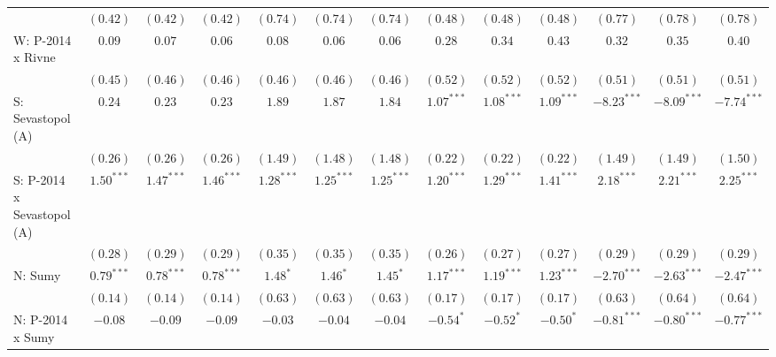 \begin{table}
\begin{center}
\begin{tiny}
\begin{tabular}{l c c c c c c c c c c c c}
                            & $(0.42)$      & $(0.42)$      & $(0.42)$      & $(0.74)$     & $(0.74)$     & $(0.74)$     & $(0.48)$      & $(0.48)$     & $(0.48)$       & $(0.77)$      & $(0.78)$      & $(0.78)$      \\
W: P-2014 x Rivne           & $0.09$        & $0.07$        & $0.06$        & $0.08$       & $0.06$       & $0.06$       & $0.28$        & $0.34$       & $0.43$         & $0.32$        & $0.35$        & $0.40$        \\
                            & $(0.45)$      & $(0.46)$      & $(0.46)$      & $(0.46)$     & $(0.46)$     & $(0.46)$     & $(0.52)$      & $(0.52)$     & $(0.52)$       & $(0.51)$      & $(0.51)$      & $(0.51)$      \\
S: Sevastopol (A)           & $0.24$        & $0.23$        & $0.23$        & $1.89$       & $1.87$       & $1.84$       & $1.07^{***}$  & $1.08^{***}$ & $1.09^{***}$   & $-8.23^{***}$ & $-8.09^{***}$ & $-7.74^{***}$ \\
                            & $(0.26)$      & $(0.26)$      & $(0.26)$      & $(1.49)$     & $(1.48)$     & $(1.48)$     & $(0.22)$      & $(0.22)$     & $(0.22)$       & $(1.49)$      & $(1.49)$      & $(1.50)$      \\
S: P-2014 x Sevastopol (A)  & $1.50^{***}$  & $1.47^{***}$  & $1.46^{***}$  & $1.28^{***}$ & $1.25^{***}$ & $1.25^{***}$ & $1.20^{***}$  & $1.29^{***}$ & $1.41^{***}$   & $2.18^{***}$  & $2.21^{***}$  & $2.25^{***}$  \\
                            & $(0.28)$      & $(0.29)$      & $(0.29)$      & $(0.35)$     & $(0.35)$     & $(0.35)$     & $(0.26)$      & $(0.27)$     & $(0.27)$       & $(0.29)$      & $(0.29)$      & $(0.29)$      \\
N: Sumy                     & $0.79^{***}$  & $0.78^{***}$  & $0.78^{***}$  & $1.48^{*}$   & $1.46^{*}$   & $1.45^{*}$   & $1.17^{***}$  & $1.19^{***}$ & $1.23^{***}$   & $-2.70^{***}$ & $-2.63^{***}$ & $-2.47^{***}$ \\
                            & $(0.14)$      & $(0.14)$      & $(0.14)$      & $(0.63)$     & $(0.63)$     & $(0.63)$     & $(0.17)$      & $(0.17)$     & $(0.17)$       & $(0.63)$      & $(0.64)$      & $(0.64)$      \\
N: P-2014 x Sumy            & $-0.08$       & $-0.09$       & $-0.09$       & $-0.03$      & $-0.04$      & $-0.04$      & $-0.54^{*}$   & $-0.52^{*}$  & $-0.50^{*}$    & $-0.81^{***}$ & $-0.80^{***}$ & $-0.77^{***}$ \\

\end{tabular}
\end{tiny}
\end{center}
\end{table}
